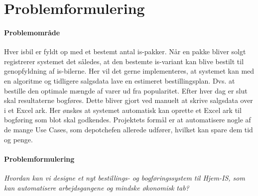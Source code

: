\chapter{Problemformulering}\label{ch:problemformulering}

\subsubsection{Problemområde}

Hver isbil er fyldt op med et bestemt antal is-pakker. Når en pakke bliver solgt registrerer systemet det således, at den bestemte is-variant kan blive bestilt til genopfyldning af is-bilerne. Her vil det gerne implementeres, at systemet kan med en algoritme og tidligere salgsdata lave en estimeret bestillingsplan. Dvs. at bestille den optimale mængde af varer ud fra popularitet. 
Efter hver dag er slut skal resultaterne bogføres. Dette bliver gjort ved manuelt at skrive salgsdata over i et Excel ark. Her ønskes at systemet automatisk kan oprette et Excel ark til bogføring som blot skal godkendes.
Projektets formål er at automatisere nogle af de mange Use Cases, som depotchefen allerede udfører, hvilket kan spare dem tid og penge.

\subsubsection{Problemformulering}
 \textit{Hvordan kan vi designe et nyt bestillings- og bogføringssystem til Hjem-IS, som kan automatisere arbejdsgangene og mindske økonomisk tab?}